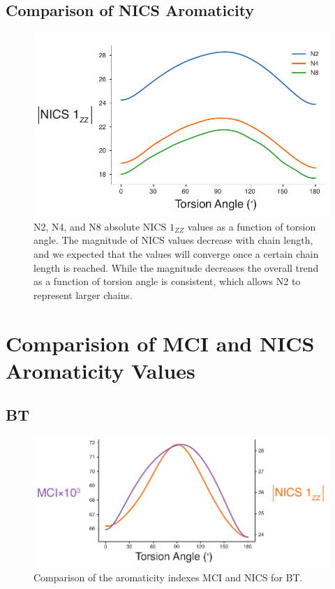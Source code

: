 \clearpage
\subsection{Comparison of NICS Aromaticity}
\begin{figure}[hbt!]
    \centering
    \includegraphics{figures/append_aroma/p_NICS_compare_copy.pdf}
    \caption{N2, N4, and N8 absolute NICS $1_{ZZ}$ values as a function of torsion angle. The magnitude of NICS values decrease with chain length, and we expected that the values will converge once a certain chain length is reached. While the magnitude decreases the overall trend as a function of torsion angle is consistent, which allows N2 to represent larger chains.}
    \label{fig:p_NICS_compare}
\end{figure}

\clearpage
\section{Comparision of MCI and NICS Aromaticity Values}

\subsection{BT}
\begin{figure}[hbt!]
    \centering
    \includegraphics{figures/append_aroma/pt_aroma_compare_copy.pdf}
    \caption{Comparison of the aromaticity indexes MCI and NICS for BT.}
    \label{fig:pt_aroma_compare}
\end{figure}

